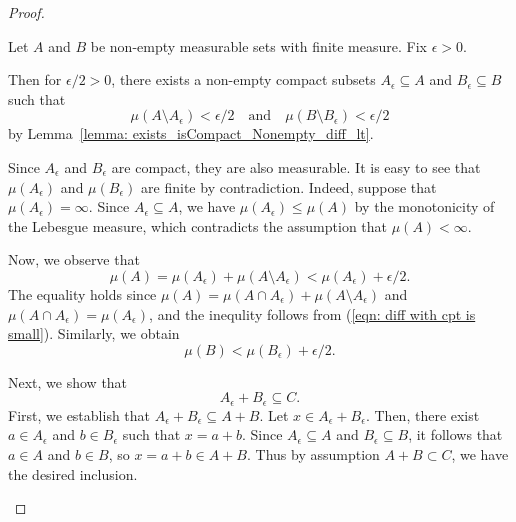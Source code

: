 \begin{proof}
\begin{enumerate}
\begin{enumerate}
            Let \(A\) and \(B\) be non-empty measurable sets with finite measure. 
            Fix \(\epsilon>0\).
            
            Then for \(\epsilon/2>0\), there exists a non-empty compact subsets \(A_\epsilon \subseteq A\) and \(B_\epsilon \subseteq B\) such that 
            \begin{equation}
                \mu(A \setminus A_\epsilon) < \epsilon/2 \quad \text{and} \quad \mu(B \setminus B_\epsilon) < \epsilon/2
                \label{eqn: diff with cpt is small}
            \end{equation}
            by Lemma~\ref{lemma: exists_isCompact_Nonempty_diff_lt}.
            
            Since \(A_\epsilon\) and \(B_\epsilon\) are compact, they are also measurable. 
            It is easy to see that \(\mu(A_\epsilon)\) and  \(\mu(B_\epsilon)\) are finite by contradiction.
            Indeed, suppose that \(\mu(A_\epsilon) = \infty\). 
            Since \(A_\epsilon \subseteq A\), we have \(\mu(A_\epsilon) \leq \mu(A)\) by the monotonicity of the Lebesgue measure, 
            which contradicts the assumption that \(\mu(A)<\infty\).

            Now, we observe that 
            \begin{equation}
                \mu(A) = \mu(A_\epsilon) + \mu(A \setminus A_\epsilon) < \mu(A_\epsilon) + \epsilon/2.
                \label{eqn: volA bdd by Ae}
            \end{equation}
            The equality holds since \(\mu(A) = \mu(A \cap A_\epsilon) + \mu(A \setminus A_\epsilon)\) and \(\mu(A \cap A_\epsilon) = \mu (A_\epsilon)\), 
            and the inequlity follows from (\ref{eqn: diff with cpt is small}).
            Similarly, we obtain 
            \begin{equation}
                \mu(B) < \mu(B_\epsilon) + \epsilon/2.
                \label{eqn: volB bdd by Be}
            \end{equation}

            
            Next, we show that 
            \begin{equation*}
                A_\epsilon + B_\epsilon \subseteq C.
            \end{equation*}
            First, we establish that \(A_\epsilon + B_\epsilon \subseteq A + B\).
            Let \(x \in A_\epsilon + B_\epsilon\). Then, there exist \(a \in A_\epsilon\) and \(b \in B_\epsilon\) such that \(x = a + b\).
            Since \(A_\epsilon \subseteq A\) and \(B_\epsilon \subseteq B\), it follows that \(a \in A\) and \(b \in B\), 
            so \(x = a + b \in A + B\).
            Thus by assumption \(A + B \subset C\), we have the desired inclusion.
            

\end{enumerate}
\end{enumerate}
\end{proof}
